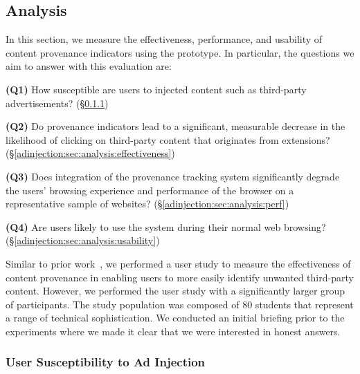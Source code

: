 \subsection{Analysis}
\label{adinjection:sec:analysis}

In this section, we measure the effectiveness, performance, and usability of
content provenance indicators using the \origintracer prototype. In particular,
the questions we aim to answer with this evaluation are:

\begin{enumerate*}
    \item[\textbf{(Q1)}] \label{adinjection:eval:q1}
    How susceptible are users to injected content such as third-party
    advertisements? (\S\ref{adinjection:sec:analysis:susceptibility})
    \item[\textbf{(Q2)}] \label{adinjection:eval:q2}
    Do provenance indicators lead to a significant, measurable decrease in the
    likelihood of clicking on third-party content that originates from
    extensions? (\S\ref{adinjection:sec:analysis:effectiveness})
    \item[\textbf{(Q3)}] \label{adinjection:eval:q3}
    Does integration of the provenance tracking system significantly degrade
    the users' browsing experience and performance of the browser on a
    representative sample of websites? (\S\ref{adinjection:sec:analysis:perf})
    \item[\textbf{(Q4)}] \label{adinjection:eval:q4}
    Are users likely to use the system during their normal web browsing?
    (\S\ref{adinjection:sec:analysis:usability})
\end{enumerate*}

Similar to prior work~\cite{chi2006phishing}, we performed a user study to
measure the effectiveness of content provenance in enabling users to more easily
identify unwanted third-party content. However, we performed the user study with
a significantly larger group of participants. The study population was composed
of 80 students that represent a range of technical sophistication. We conducted
an initial briefing prior to the experiments where we made it clear that we were
interested in honest answers.

\subsubsection{User Susceptibility to Ad Injection}
\label{adinjection:sec:analysis:susceptibility}



